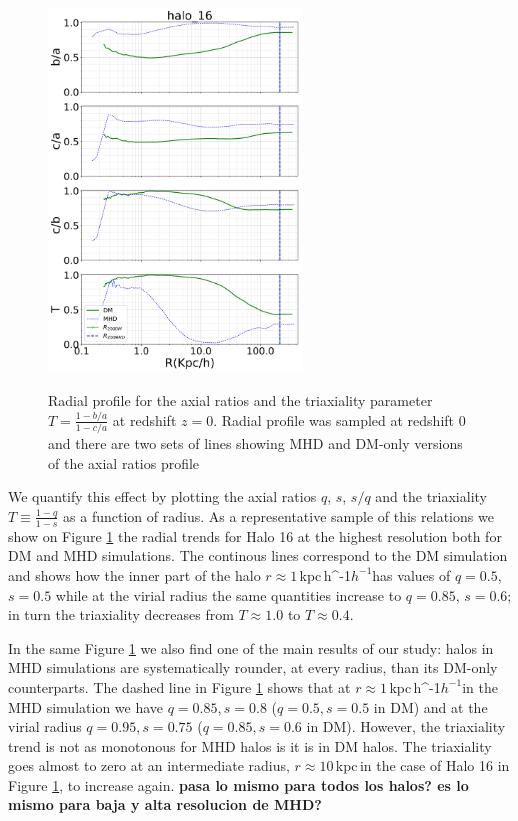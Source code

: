 \documentclass[a4paper,fleqn,usenatbib]{mnras}
\newcommand{\kpch}{\,{\rm kpc}\,\ifmmode h^{-1}\else $h^{-1}$\fi}
\newcommand{\kpc}{\,{\rm kpc}\,}
\begin{document}
\begin{figure}
\centering
{\includegraphics[width=0.6\textwidth]{./pics/halo16.png}}
\caption{Radial profile for the axial ratios and the triaxiality parameter
  $T=\frac{1-b/a}{1-c/a}$ at redshift $z=0$. 
  Radial profile was sampled at
  redshift 0 and there are two sets of lines showing MHD and DM-only
  versions of the axial ratios profile} \label{fig:triaxial_radius}
\end{figure} 


We quantify this effect by plotting the axial ratios $q$, $s$,
$s/q$ and the triaxiality $T\equiv \frac{1-q}{1-s}$ as a
function of radius. 
As a representative sample of this relations we show on Figure
\ref{fig:triaxial_radius} the radial trends for Halo 16 at
the highest resolution both for DM and MHD simulations.
The continous lines correspond to the DM simulation and shows how
the inner part of the halo $r\approx 1$\kpch has values of 
$q=0.5$, $s=0.5$ while at the virial radius the same
quantities increase to $q=0.85$, $s=0.6$; in turn the triaxiality
decreases from $T\approx 1.0$ to $T\approx0.4$. 

In the same Figure \ref{fig:triaxial_radius} we also find one of the
main results of our study: halos in MHD simulations are systematically rounder, at
every radius, than its DM-only counterparts.  
The dashed line in Figure \ref{fig:triaxial_radius} shows that at
$r\approx 1$\kpch  in the MHD simulation we have $q=0.85, s=0.8$
($q=0.5, s=0.5$ in DM) and at the virial radius $q=0.95, s=0.75$
($q=0.85, s=0.6$ in DM).  
However, the triaxiality trend is not as monotonous for MHD halos is
it is in DM halos. 
The triaxiality goes almost to zero at an intermediate radius,
$r\approx 10$\kpc in the case of Halo 16 in Figure
\ref{fig:triaxial_radius}, to increase again. {\bf pasa lo mismo para
  todos los halos? es lo mismo para baja y alta resolucion de MHD?}
    
\end{document}
